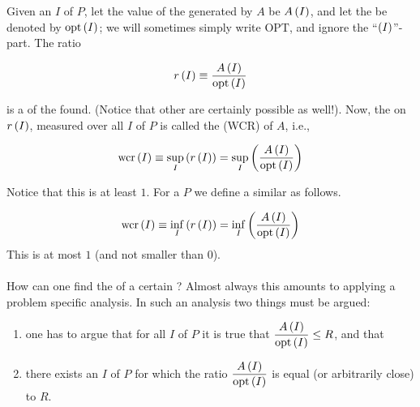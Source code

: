 \begin{definition}
Given an  $I$ of  $P$, let the value of the  generated by  $A$ be $A\left( I \right)$, and let the  be denoted by $\mbox{opt}\left( I \right)$; we will sometimes simply write $\mbox{OPT}$, and ignore the ``$\left( I \right)$''-part. The ratio

\begin{equation}
r\left( I \right)\equiv\displaystyle\frac{A\left( I \right)}{\mbox{opt}\left( I \right)}
\end{equation}

is a  of the  found. (Notice that other  are certainly possible as well!). Now, the  on $r\left( I \right)$, measured over all  $I$ of $P$ is called the  (WCR) of  $A$, i.e.,

\begin{equation}
\mbox{wcr}\left( I \right)\equiv\sup_I\left( r\left( I \right) \right)=\sup_I\left( \displaystyle\frac{A\left( I \right)}{\mbox{opt}\left( I \right)} \right)
\end{equation}

Notice that this  is at least $1$. For a  $P$ we define a similar  as
follows.

\begin{equation}
\mbox{wcr}\left( I \right)\equiv\inf_I\left( r\left( I \right) \right)=\inf_I\left( \displaystyle\frac{A\left( I \right)}{\mbox{opt}\left( I \right)} \right)
\end{equation}
This  is at most $1$ (and not smaller than $0$).
\end{definition}

\paragraph{}
How can one find the  of a certain ? Almost always this amounts to applying a problem specific analysis. In such an analysis two things must
be argued:
\begin{enumerate}
 \item one has to argue that for all  $I$ of $P$ it is true that $\dfrac{A\left( I \right)}{\mbox{opt}\left( I \right)}\leq R$, and that
 \item there exists an  $I$ of $P$ for which the ratio $\dfrac{A\left( I \right)}{\mbox{opt}\left( I \right)}$ is equal (or arbitrarily close) to $R$.
\end{enumerate}

